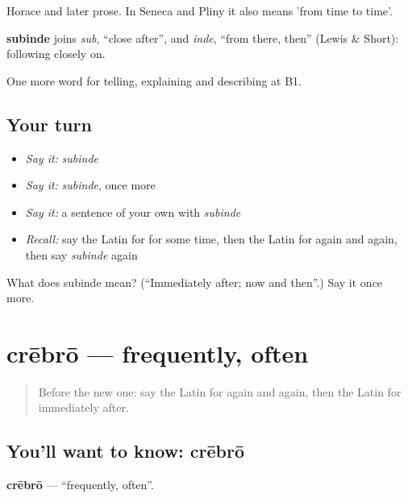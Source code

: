 Horace and later prose. In Seneca and Pliny it also means 'from time to time'.

\begin{cousinweb}
\textbf{subinde} joins \emph{sub}, \textquotedblleft{}close after\textquotedblright{}, and \emph{inde}, \textquotedblleft{}from there, then\textquotedblright{} (Lewis \& Short): following closely on.
\end{cousinweb}

\begin{grammarlens}[title={What you've built}]
One more word for telling, explaining and describing at B1.
\end{grammarlens}

\subsection*{Your turn}
\begin{itemize}
\raggedright
  \item \emph{Say it:} \emph{subinde}
  \item \emph{Say it:} \emph{subinde}, once more
  \item \emph{Say it:} a sentence of your own with \emph{subinde}
  \item \emph{Recall:} say the Latin for for some time, then the Latin for again and again, then say \emph{subinde} again
\end{itemize}

\begin{tcolorbox}[breakable,colback=teal!4,colframe=teal!35!black,title={Before you move on}]
What does subinde mean? (\textquotedblleft{}Immediately after; now and then\textquotedblright{}.) Say it once more.
\end{tcolorbox}
\section[crēbrō]{crēbrō — frequently, often}

\label{lesson:LA-C294-crebro}



\begin{quote}
Before the new one: say the Latin for again and again, then the Latin for immediately after.
\end{quote}

\subsection*{You'll want to know: crēbrō}
\textbf{crēbrō} — \textquotedblleft{}frequently, often\textquotedblright{}.


